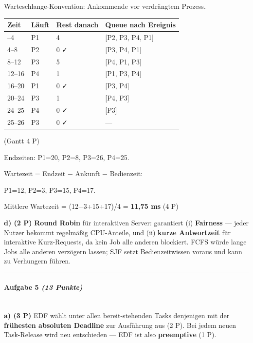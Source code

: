 \documentclass[11pt, a4paper]{article}
\begin{document}
Warteschlange-Konvention: Ankommende vor verdrängtem Prozess.



{\small
\begin{tabularx}{\linewidth}{XXXX}
\hline
\rowcolor{tableheadbg}
{\color{white}\textbf{Zeit}} & {\color{white}\textbf{Läuft}} & {\color{white}\textbf{Rest danach}} & {\color{white}\textbf{Queue nach Ereignis}} \\[2pt]
\hline
\endhead
\hline
\endfoot
0–4 & P1 & 4 & [P2, P3, P4, P1] \\
4–8 & P2 & 0 ✓ & [P3, P4, P1] \\
8–12 & P3 & 5 & [P4, P1, P3] \\
12–16 & P4 & 1 & [P1, P3, P4] \\
16–20 & P1 & 0 ✓ & [P3, P4] \\
20–24 & P3 & 1 & [P4, P3] \\
24–25 & P4 & 0 ✓ & [P3] \\
25–26 & P3 & 0 ✓ & — \\
\end{tabularx}
}


(Gantt 4 P)


Endzeiten: P1=20, P2=8, P3=26, P4=25.

Wartezeit = Endzeit − Ankunft − Bedienzeit:

P1=12, P2=3, P3=15, P4=17.

Mittlere Wartezeit = (12+3+15+17)/4 = \textbf{11,75 ms} (4 P)


\textbf{d) (2 P)} \textbf{Round Robin} für interaktiven Server: garantiert (i) \textbf{Fairness} — jeder Nutzer bekommt regelmäßig CPU-Anteile, und (ii) \textbf{kurze Antwortzeit} für interaktive Kurz-Requests, da kein Job alle anderen blockiert. FCFS würde lange Jobs alle anderen verzögern lassen; SJF setzt Bedienzeitwissen voraus und kann zu Verhungern führen.



\noindent\textcolor{rulegray}{\rule{\linewidth}{0.4pt}}


\paragraph{Aufgabe 5 \textit{(13 Punkte)}}\mbox{}\\[2pt]

\textbf{a) (3 P)} EDF wählt unter allen bereit-stehenden Tasks denjenigen mit der \textbf{frühesten absoluten Deadline} zur Ausführung aus (2 P). Bei jedem neuen Task-Release wird neu entschieden — EDF ist also \textbf{preemptive} (1 P).
\end{document}
